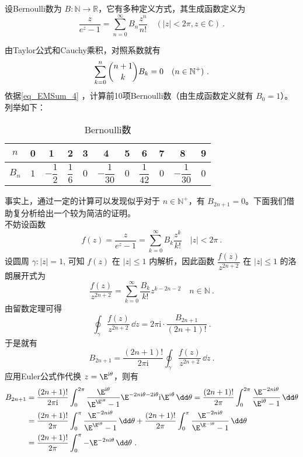 \begin{definition}{}
设Bernoulli数为 $B:\mathbb{N}\to\mathbb{R} $，它有多种定义方式，其生成函数定义为
\begin{equation}
    \frac{z}{e^{z}-1}=\sum_{n=0}^{\infty}B_{n}\frac{z^{n}}{n!}
    \quad(|z|<2\pi,z\in{\mathbb C})~.
\end{equation}
\end{definition}
由Taylor公式和Cauchy乘积，对照系数就有
\begin{equation}\label{eq_EMSum_4}
    \sum_{k=0}^{n}\dbinom{n+1}{k}B_{k}=0\quad(n\in{\mathbb N^{+}})~.
\end{equation}
依据\autoref{eq_EMSum_4} ，计算前10项Bernoulli数（由生成函数定义就有 $B_{0}=1$）。列举如下：
\begin{table}[ht]
\centering
\caption{Bernoulli数}
\begin{tabular}{|c|c|c|c|c|c|c|c|c|c|c|}
\hline
$ n $ & 0 & 1 & 2 & 3 & 4 & 5 & 6 & 7 & 8 & 9\\ 
\hline
$ B_{n} $ & $1$ & $-\dfrac{1}{2}$ & $ \dfrac{1}{6}$ & $0$ & $-\dfrac{1}{30}$ & $0$ & $\dfrac{1}{42}$ & $0$ & $-\dfrac{1}{30}$ & $0$\\
\hline
\end{tabular}
\end{table}
事实上，通过一定的计算可以发现似乎对于 $n\in\mathbb N^+$，有 $B_{2n+1}=0$。下面我们借助复分析给出一个较为简洁的证明。\\
不妨设函数
\[
f(z)=\frac{z}{e^{z}-1}=\sum_{k=0}^{\infty}B_{k}\frac{z^{k}}{k!}\quad|z|<2\pi~.
\]
设圆周 $\gamma:|z|=1$, 可知 $f(z)$ 在 $|z|\leq 1$ 内解析，因此函数 $\dfrac{f(z)}{z^{2n+2}}$ 在 $|z|\leq 1$ 的洛朗展开式为
\[
\frac{f(z)}{z^{2n+2}}=\sum_{k=0}^{\infty}\frac{B_{k}}{k!}{z^{k-2n-2}}\quad n\in\mathbb N~.
\]
由留数定理可得
\[
\oint_{\gamma}\frac{f(z)}{z^{2 n+2}}\,\dd z=2\pi\mathrm i\cdot\frac{B_{2 n+1}}{(2n+1)!}~.
\]
于是就有
\[
B_{2n+1}=\frac{(2n+1)!}{2\pi\mathrm i}\oint_{\gamma}\frac{f(z)}{z^{2 n+2}}\,\dd z~.
\]
应用Euler公式作代换 $z=\E^{\mathrm i\theta}$，则有
$$
\begin{aligned}
B_{2n+1}&=\frac{(2n+1)!}{2\pi\mathrm i}\int_{0}^{2\pi}\frac{\E^{\mathrm i\theta}}{\E^{\E^{\mathrm i\theta}}-1}\E^{-2n\mathrm i\theta-2\mathrm i\theta}\mathrm i\E^{i \theta}\,\dd\theta
=\frac{(2n+1)!}{2\pi}\int_{0}^{2\pi}\frac{\E^{-2n\mathrm i\theta}}{\E^{\mathrm i\theta}-1}\,\dd\theta\\
&=\frac{(2n+1)!}{2\pi}\int_{0}^{\pi}\frac{\E^{-2n\mathrm i\theta}}{\E^{\E^{\mathrm i\theta}}-1}\,\dd \theta+\frac{(2n+1)!}{2\pi}\int_{0}^{\pi} \frac{\E^{-2n\mathrm i\theta}}{\E^{\E^{-\mathrm i\theta}}-1}\,\dd \theta\\
&=\frac{(2 n+1)!}{2\pi}\int_{0}^{\pi}-\E^{-2n\mathrm i\theta}\,\dd\theta~.
\end{aligned}
$$
